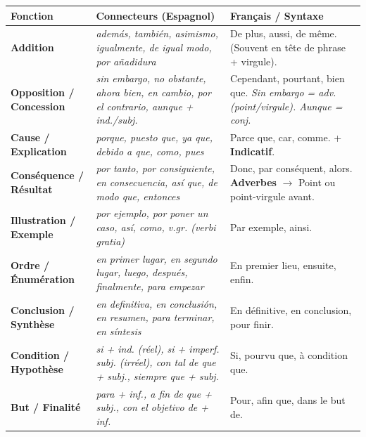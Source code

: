 \documentclass[11pt]{article}
\newcommand{\esp}[1]{\ifmmode\text{\textit{#1}}\else\begingroup\selectlanguage{spanish}\itshape #1\endgroup\fi}
\begin{document}
\begin{aretenir}
\begin{center}
\begin{tabularx}{\linewidth}{|X|X|X|}
\hline
\rowcolor{popblueL} \textbf{Fonction} & \textbf{Connecteurs (Espagnol)} & \textbf{Français / Syntaxe} \\ \hline
\textbf{Addition} & \esp{además, también, asimismo, igualmente, de igual modo, por añadidura} & De plus, aussi, de même. (Souvent en tête de phrase + virgule). \\ \hline
\textbf{Opposition / Concession} & \esp{sin embargo, no obstante, ahora bien, en cambio, por el contrario, aunque + ind./subj.} & Cependant, pourtant, bien que. \esp{Sin embargo} = adv. (point/virgule). \esp{Aunque} = conj. \\ \hline
\textbf{Cause / Explication} & \esp{porque, puesto que, ya que, debido a que, como, pues} & Parce que, car, comme. + \textbf{Indicatif}. \\ \hline
\textbf{Conséquence / Résultat} & \esp{por tanto, por consiguiente, en consecuencia, así que, de modo que, entonces} & Donc, par conséquent, alors. \textbf{Adverbes} $\rightarrow$ Point ou point-virgule avant. \\ \hline
\textbf{Illustration / Exemple} & \esp{por ejemplo, por poner un caso, así, como, v.gr. (verbi gratia)} & Par exemple, ainsi. \\ \hline
\textbf{Ordre / Énumération} & \esp{en primer lugar, en segundo lugar, luego, después, finalmente, para empezar} & En premier lieu, ensuite, enfin. \\ \hline
\textbf{Conclusion / Synthèse} & \esp{en definitiva, en conclusión, en resumen, para terminar, en síntesis} & En définitive, en conclusion, pour finir. \\ \hline
\textbf{Condition / Hypothèse} & \esp{si + ind. (réel), si + imperf. subj. (irréel), con tal de que + subj., siempre que + subj.} & Si, pourvu que, à condition que. \\ \hline
\textbf{But / Finalité} & \esp{para + inf., a fin de que + subj., con el objetivo de + inf.} & Pour, afin que, dans le but de. \\ \hline
\end{tabularx}
\end{center}
\end{aretenir}
\end{document}
